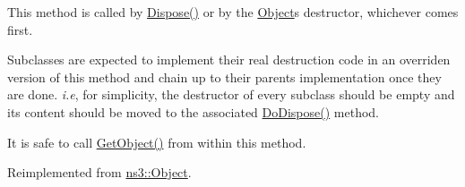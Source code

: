 This method is called by \hyperlink{classns3_1_1Object_aa90ae598863f6c251cdab3c3722afdaf}{Dispose()} or by the \hyperlink{classns3_1_1Object}{Object}\textquotesingle{}s destructor, whichever comes first.

Subclasses are expected to implement their real destruction code in an overriden version of this method and chain up to their parent\textquotesingle{}s implementation once they are done. {\itshape i.\+e}, for simplicity, the destructor of every subclass should be empty and its content should be moved to the associated \hyperlink{classns3_1_1UdpL4Protocol_ac65581352483fff231c47521455b9ce9}{Do\+Dispose()} method.

It is safe to call \hyperlink{classns3_1_1Object_a13e18c00017096c8381eb651d5bd0783}{Get\+Object()} from within this method. 

Reimplemented from \hyperlink{classns3_1_1Object_a475d429a75d302d4775f4ae32479b287}{ns3\+::\+Object}.


